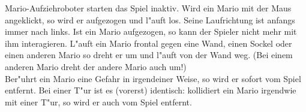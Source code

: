 Mario-Aufziehroboter starten das Spiel inaktiv. Wird ein Mario mit der Maus angeklickt, so wird er aufgezogen und l"auft los. Seine Laufrichtung ist anfangs immer nach links. Ist ein Mario aufgezogen, so kann der Spieler nicht mehr mit ihm interagieren. 
L"auft ein Mario frontal gegen eine Wand, einen Sockel oder einen anderen Mario so dreht er um und l"auft von der Wand weg. (Bei einem anderen Mario dreht der andere Mario auch um!)\\
Ber"uhrt ein Mario eine Gefahr in irgendeiner Weise, so wird er sofort vom Spiel entfernt. 
Bei einer T"ur ist es (vorerst) identisch: kollidiert ein Mario irgendwie mit einer T"ur, so wird er auch vom Spiel entfernt.